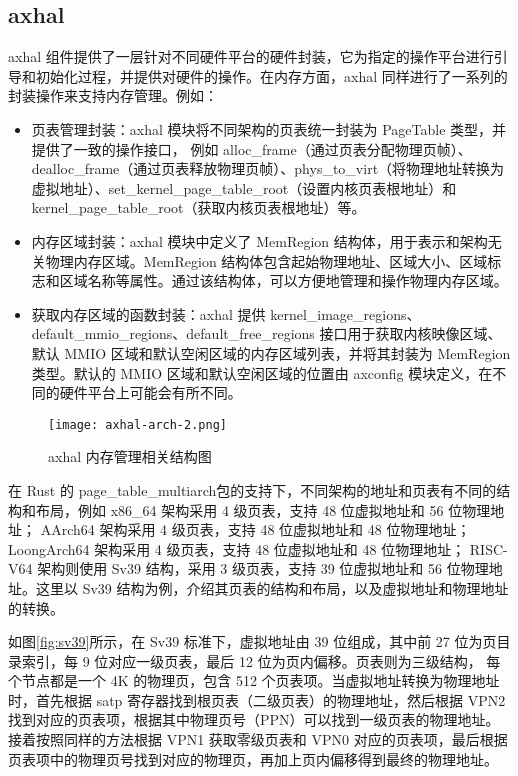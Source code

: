 \subsection{axhal}

axhal 组件提供了一层针对不同硬件平台的硬件封装，它为指定的操作平台进行引导和初始化过程，并提供对硬件的操作。在内存方面，axhal 同样进行了一系列的封装操作来支持内存管理。例如：

\begin{itemize}
\item 页表管理封装：axhal 模块将不同架构的页表统一封装为 PageTable 类型，并提供了一致的操作接口，
例如 alloc\_frame（通过页表分配物理页帧）、dealloc\_frame（通过页表释放物理页帧）、phys\_to\_virt（将物理地址转换为虚拟地址）、set\_kernel\_page\_table\_root（设置内核页表根地址）和kernel\_page\_table\_root（获取内核页表根地址）等。
\item 内存区域封装：axhal 模块中定义了 MemRegion 结构体，用于表示和架构无关物理内存区域。MemRegion 结构体包含起始物理地址、区域大小、区域标志和区域名称等属性。通过该结构体，可以方便地管理和操作物理内存区域。
\item 获取内存区域的函数封装：axhal 提供 kernel\_image\_regions、default\_mmio\_regions、default\_free\_regions 接口用于获取内核映像区域、默认 MMIO 区域和默认空闲区域的内存区域列表，并将其封装为 MemRegion 类型。默认的 MMIO 区域和默认空闲区域的位置由 axconfig 模块定义，在不同的硬件平台上可能会有所不同。
\end{itemize}

\begin{figure}
  \centering
  \texttt{[image: axhal-arch-2.png]}
  \caption{axhal 内存管理相关结构图}
  \label{fig:axhal-arch}
\end{figure}

在 Rust 的 page\_table\_multiarch包的支持下，不同架构的地址和页表有不同的结构和布局，例如 x86\_64 架构采用 4 级页表，支持 48 位虚拟地址和 56 位物理地址；
AArch64 架构采用 4 级页表，支持 48 位虚拟地址和 48 位物理地址；LoongArch64 架构采用 4 级页表，支持 48 位虚拟地址和 48 位物理地址\cite{1024579329.nh}；
RISC-V64 架构则使用 Sv39 结构，采用 3 级页表，支持 39 位虚拟地址和 56 位物理地址。这里以 Sv39 结构为例，介绍其页表的结构和布局，以及虚拟地址和物理地址的转换。

如图\ref{fig:sv39}所示，在 Sv39 标准下，虚拟地址由 39 位组成，其中前 27 位为页目录索引，每 9 位对应一级页表，最后 12 位为页内偏移。页表则为三级结构，
每个节点都是一个 4K 的物理页，包含 512 个页表项。当虚拟地址转换为物理地址时，首先根据 satp 寄存器找到根页表（二级页表）的物理地址，然后根据 VPN2 找到对应的页表项，根据其中物理页号（PPN）可以找到一级页表的物理地址。
接着按照同样的方法根据 VPN1 获取零级页表和 VPN0 对应的页表项，最后根据页表项中的物理页号找到对应的物理页，再加上页内偏移得到最终的物理地址\cite{1024446289.nh}。


